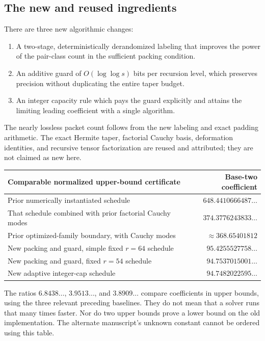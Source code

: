 \documentclass[11pt,letterpaper]{article}
\numberwithin{equation}{section}
\theoremstyle{definition}\newtheorem{definition}[theorem]{Definition}
\theoremstyle{remark}\newtheorem{remark}[theorem]{Remark}
\begin{document}
\subsection{The new and reused ingredients}

There are three new algorithmic changes:
\begin{enumerate}
\item A two-stage, deterministically derandomized labeling that improves the
power of the pair-class count in the sufficient packing condition.
\item An additive guard of $O(\log\log s)$ bits per recursion level, which
preserves precision without duplicating the entire taper budget.
\item An integer capacity rule which pays the guard explicitly and attains
the limiting leading coefficient with a single algorithm.
\end{enumerate}
The nearly lossless packet count follows from the new labeling and exact
padding arithmetic. The exact Hermite taper, factorial Cauchy basis,
deformation identities, and recursive tensor factorization are reused
and attributed; they are not claimed as new here.

\begin{center}
\begin{tabular}{@{}lr@{}}
\toprule
Comparable normalized upper-bound certificate & Base-two coefficient\\
\midrule
Prior numerically instantiated schedule & $648.4410666487\ldots$\\
That schedule combined with prior factorial Cauchy modes & $374.3776243833\ldots$\\
Prior optimized-family boundary, with Cauchy modes & $\approx368.65401812$\\
New packing and guard, simple fixed $r=64$ schedule & $95.4255527758\ldots$\\
New packing and guard, fixed $r=54$ schedule & $94.7537015001\ldots$\\
New adaptive integer-cap schedule & $\mathbf{94.7482022595\ldots}$\\
\bottomrule
\end{tabular}
\end{center}

The ratios $6.8438\ldots$, $3.9513\ldots$, and $3.8909\ldots$ compare
coefficients in upper bounds, using the three relevant preceding baselines.
They do not mean that a solver runs that many times faster.
Nor do two upper bounds prove a lower bound on the old implementation.
The alternate manuscript's unknown constant cannot be ordered using
this table.
\end{document}
